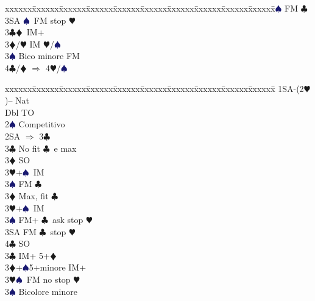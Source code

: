 \documentclass[a4paper,italian]{article}
\newcommand{\BC}{\textcolor{OliveGreen}{$\clubsuit$}}
\newcommand{\BD}{\textcolor{RedOrange}{$\vardiamondsuit$}}
\newcommand{\BH}{\textcolor{Red2}{$\varheartsuit${}}}
\newcommand{\BS}{\textcolor{MidnightBlue}{$\spadesuit${}}}
\newenvironment{bidtable}
{\begin{tabbing}

    xxxxxx\=xxxxxx\=xxxxxx\=xxxxxx\=xxxxxx\=xxxxxx\=xxxxxx\=xxxxxx\=xxxxxx\=xxxxxx\=\kill}
{\end{tabbing} }%
\begin{document}
\begin{multicols}{2}
\begin{bidtable}
                                            3\BS \> FM \BC \\
                                            3SA \BS\ FM stop \BH \-\-\\
                                            3\BC {}\BD\ IM+\\
                                            3\BD/\BH \> IM \BH /\BS \\
                                            3\BS \> Bico minore FM\\
                                            4\BC/\BD \> $\Rightarrow$ 4\BH /\BS \-
                                        \end{bidtable}
                                        \begin{bidtable}
                                            1SA-(2\BH)--\> \> Nat\+\\
                                            Dbl \> TO\\
                                            2\BS \> Competitivo\\
                                            2SA \> $\Rightarrow$ 3\BC \+\\
                                            3\BC \> No fit \BC\ e max\+\\
                                            3\BD \> SO\\
                                            3\BH {}+\BS\ IM\\
                                            3\BS \> FM \BC \-\\
                                            3\BD \> Max, fit \BC \+\\
                                            3\BH {}+\BS\ IM\\
                                            3\BS \> FM+ \BC\ ask stop \BH \\
                                            3SA \> FM \BC\ stop \BH \\
                                            4\BC \> SO\-\-\\
                                            3\BC \> IM+ 5+\BD \\
                                            3\BD {}+\BS 5+minore IM+\\
                                            3\BH {}\BS\ FM no stop \BH \\
                                            3\BS \> Bicolore minore\\

\end{bidtable}
\end{multicols}
\end{document}
